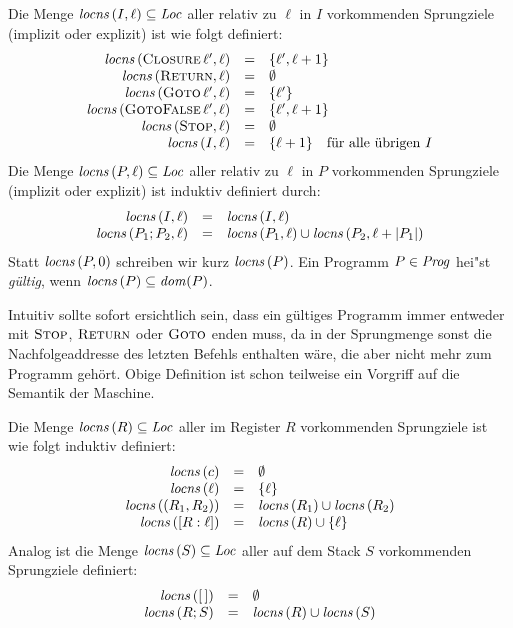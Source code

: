 \documentclass[12pt,fleqn]{article}
\begin{document}
\begin{definition}
  Die Menge ${\text{\it locns\/}}\,(I,\ell)\subseteq{\text{\it Loc\/}}$ aller relativ zu $\ell$ in $I$ vorkommenden Sprungziele (implizit oder
  explizit) ist wie folgt definiert:
  \[\begin{array}{rcl}
    {\text{\it locns\/}}\,(\textsc{Closure}\,\ell',\ell) &=& \{\ell',\ell+1\} \\
    {\text{\it locns\/}}\,(\textsc{Return},\ell) &=& \emptyset \\
    {\text{\it locns\/}}\,(\textsc{Goto}\,\ell',\ell) &=& \{\ell'\} \\
    {\text{\it locns\/}}\,(\textsc{GotoFalse}\,\ell',\ell) &=& \{\ell',\ell+1\} \\
    {\text{\it locns\/}}\,(\textsc{Stop},\ell) &=& \emptyset \\
    {\text{\it locns\/}}\,(I,\ell) &=& \{\ell+1\} \quad \text{f\"ur alle \"ubrigen $I$}
  \end{array}\]
  Die Menge ${\text{\it locns\/}}\,(P,\ell)\subseteq{\text{\it Loc\/}}$ aller relativ zu $\ell$ in $P$ vorkommenden Sprungziele (implizit oder
  explizit) ist induktiv definiert durch:
  \[\begin{array}{rcl}
    {\text{\it locns\/}}\,(I,\ell) &=& {\text{\it locns\/}}\,(I,\ell) \\
    {\text{\it locns\/}}\,(P_1;P_2,\ell) &=& {\text{\it locns\/}}\,(P_1,\ell) \cup {\text{\it locns\/}}\,(P_2,\ell+|P_1|)
  \end{array}\]
  Statt ${\text{\it locns\/}}\,(P,0)$ schreiben wir kurz ${\text{\it locns\/}}\,(P)$.
  Ein Programm $P\in{\text{\it Prog\/}}$ hei"st {\em g\"ultig}, wenn ${\text{\it locns\/}}\,(P) \subseteq {\text{\it dom\/}}(P)$.
\end{definition}

Intuitiv sollte sofort ersichtlich sein, dass ein g\"ultiges Programm immer entweder mit $\textsc{Stop}$,
$\textsc{Return}$ oder $\textsc{Goto}$ enden muss, da in der Sprungmenge sonst die Nachfolgeaddresse des
letzten Befehls enthalten w\"are, die aber nicht mehr zum Programm geh\"ort. Obige Definition ist schon
teilweise ein Vorgriff auf die Semantik der Maschine.

\begin{definition}
  Die Menge ${\text{\it locns\/}}\,(R) \subseteq {\text{\it Loc\/}}$ aller im Register $R$ vorkommenden Sprungziele ist wie folgt induktiv
  definiert:
  \[\begin{array}{rcl}
    {\text{\it locns\/}}\,(c) &=& \emptyset \\
    {\text{\it locns\/}}\,(\ell) &=& \{\ell\} \\
    {\text{\it locns\/}}\,((R_1,R_2)) &=& {\text{\it locns\/}}\,(R_1) \cup {\text{\it locns\/}}\,(R_2) \\
    {\text{\it locns\/}}\,([R:\ell]) &=& {\text{\it locns\/}}\,(R) \cup \{\ell\}
  \end{array}\]
  Analog ist die Menge ${\text{\it locns\/}}\,(S) \subseteq {\text{\it Loc\/}}$ aller auf dem Stack $S$ vorkommenden Sprungziele definiert:
  \[\begin{array}{rcl}
    {\text{\it locns\/}}\,([\,]) &=& \emptyset \\
    {\text{\it locns\/}}\,(R;S) &=& {\text{\it locns\/}}\,(R) \cup {\text{\it locns\/}}\,(S)
  \end{array}\]
\end{definition}
\end{document}
